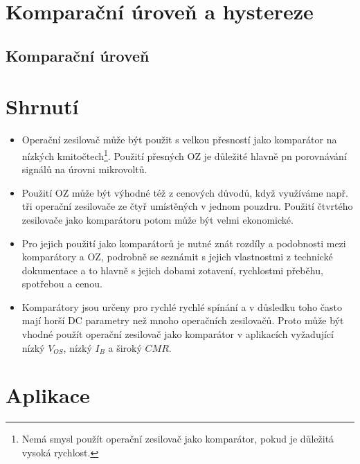     \section{Komparační úroveň a hystereze}
      \subsection{Komparační úroveň}
        
    \section{Shrnutí}
      \begin{itemize}[noitemsep]
        \item Operační zesilovač může být použit s velkou přesností jako komparátor na níz­kých
              kmitočtech\footnote{Nemá smysl použít operační zesilovač jako komparátor, pokud je
              důležitá vysoká rychlost.}. Použití přesných OZ je důležité hlavně pn porovnávání
              signálů na úrovni mikrovoltů.
        \item Použití OZ může být výhodné též z cenových důvodů, když využíváme např. tři operační
              zesilovače ze čtyř umístěných v jednom pouzdru. Použití čtvrtého zesilovače jako
              komparátoru potom může být velmi ekonomické. 
        \item Pro jejich použití jako komparátorů je nutné znát rozdíly a podobnosti mezi
              komparátory a OZ, podrobně se seznámit s jejich vlastnostmi z technické dokumentace
              a to hlavně s jejich dobami zotavení, rychlostmi přeběhu, spotřebou a cenou.
        \item Komparátory jsou určeny pro rychlé rychlé spínání a v důsledku toho často mají horší
              DC parametry než mnoho operačních zesilovačů. Proto může být vhodné použít operační
              zesilovač jako komparátor v aplikacích vyžadující nízký \(V_{OS}\), nízký \(I_B\) a
              široký \(CMR\).
      \end{itemize}        

  
  \section{Aplikace}  


